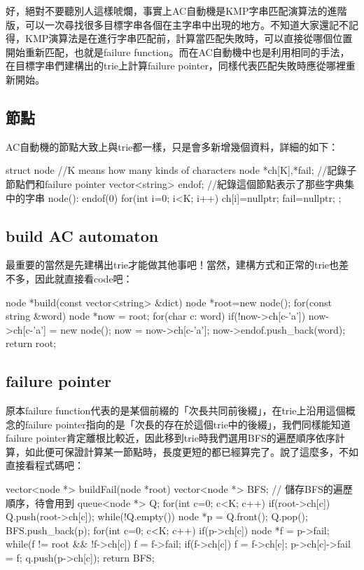 好，絕對不要聽別人這樣唬爛，事實上AC自動機是KMP字串匹配演算法的進階版，可以一次尋找很多目標字串各個在主字串中出現的地方。不知道大家還記不記得，KMP演算法是在進行字串匹配前，計算當匹配失敗時，可以直接從哪個位置開始重新匹配，也就是failure function。而在AC自動機中也是利用相同的手法，在目標字串們建構出的trie上計算failure pointer，同樣代表匹配失敗時應從哪裡重新開始。
\subsection{節點}
AC自動機的節點大致上與trie都一樣，只是會多新增幾個資料，詳細的如下：
\begin{C++}
struct node{ //K means how many kinds of characters
	node *ch[K],*fail; //記錄子節點們和failure pointer
	vector<string> endof; //紀錄這個節點表示了那些字典集中的字串
	node(): endof(0){
		for(int i=0; i<K; i++) ch[i]=nullptr;
		fail=nullptr;
	}
};
\end{C++}
\subsection{build AC automaton}
最重要的當然是先建構出trie才能做其他事吧！當然，建構方式和正常的trie也差不多，因此就直接看code吧：
\begin{C++}
node *build(const vector<string> &dict) {
    node *root=new node();
    for(const string &word) {
		node *now = root;
		for(char c: word) {
			if(!now->ch[c-'a'])
				now->ch[c-'a'] = new node();
			now = now->ch[c-'a'];
		}
		now->endof.push_back(word);
    }
    return root;
}
\end{C++}
\subsection{failure pointer}
原本failure function代表的是某個前綴的「次長共同前後綴」，在trie上沿用這個概念的failure pointer指向的是「次長的存在於這個trie中的後綴」，我們同樣能知道failure pointer肯定離根比較近，因此移到trie時我們選用BFS的遍歷順序依序計算，如此便可保證計算某一節點時，長度更短的都已經算完了。說了這麼多，不如直接看程式碼吧：
\begin{C++}
vector<node *> buildFail(node *root) {
	vector<node *> BFS; // 儲存BFS的遍歷順序，待會用到
	queue<node *> Q;
	for(int c=0; c<K; c++)
		if(root->ch[c])
			Q.push(root->ch[c]);
	while(!Q.empty()) {
		node *p = Q.front(); Q.pop();
		BFS.push_back(p);
		for(int c=0; c<K; c++) if(p->ch[c]) {
			node *f = p->fail;
			while(f != root && !f->ch[c]) f = f->fail;
			if(f->ch[c]) f = f->ch[c];
			p->ch[c]->fail = f;
			q.push(p->ch[c]);
		}
	}
	return BFS;
}
\end{C++}
